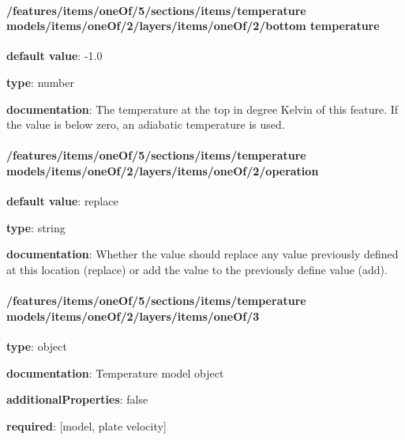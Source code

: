 \begin{itemized}
\end{itemized}\paragraph{/features/items/oneOf/5/sections/items/temperature models/items/oneOf/2/layers/items/oneOf/2/bottom temperature} \begin{itemized}
\item {\bf default value}: -1.0
\item {\bf type}: number
\item {\bf documentation}: The temperature at the top in degree Kelvin of this feature. If the value is below zero, an adiabatic temperature is used.
\end{itemized}\paragraph{/features/items/oneOf/5/sections/items/temperature models/items/oneOf/2/layers/items/oneOf/2/operation} \begin{itemized}
\item {\bf default value}: replace
\item {\bf type}: string
\item {\bf documentation}: Whether the value should replace any value previously defined at this location (replace) or add the value to the previously define value (add).
\end{itemized}\paragraph{/features/items/oneOf/5/sections/items/temperature models/items/oneOf/2/layers/items/oneOf/3} \begin{itemized}
\item {\bf type}: object
\item {\bf documentation}: Temperature model object
\item {\bf additionalProperties}: false
\item {\bf required}: [model, plate velocity]\end{itemized}
